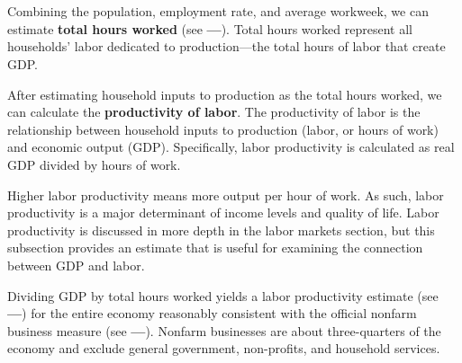 \begin{minipage}{0.36\textwidth}
\\
\end{minipage} \hspace{5mm}
\begin{minipage}{0.36\textwidth}
\\
\end{minipage}
\vspace{2mm}

\begin{minipage}{0.76\textwidth} 
\small Combining the population, employment rate, and average workweek, we can estimate \textbf{total hours worked} (see {\color{orange}\textbf{---}}). Total hours worked represent all households' labor dedicated to production---the total hours of labor that create GDP. 
\end{minipage}
\newpage
\begin{minipage}{0.76\textwidth}
 
\small After estimating household inputs to production as the total hours worked, we can calculate the \textbf{productivity of labor}. The productivity of labor is the relationship between household inputs to production (labor, or hours of work) and economic output (GDP). Specifically, labor productivity is calculated as real GDP divided by hours of work. 

Higher labor productivity means more output per hour of work. As such, labor productivity is a major determinant of income levels and quality of life. Labor productivity is discussed in more depth in the labor markets section, but this subsection provides an estimate that is useful for examining the connection between GDP and labor.

Dividing GDP by total hours worked yields a labor productivity estimate (see {\color{paleblue}\textbf{---}}) for the entire economy reasonably consistent with the official nonfarm business measure (see {\color{violet}\textbf{---}}). Nonfarm businesses are about three-quarters of the economy and exclude general government, non-profits, and household services. 
\end{minipage}
\vspace{1mm}

